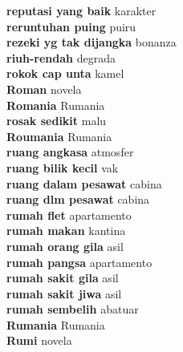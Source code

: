 \textbf{ reputasi yang baik  } karakter \\
\textbf{ reruntuhan puing  } puiru \\
\textbf{ rezeki yg tak dijangka  } bonanza \\
\textbf{ riuh-rendah  } degrada \\
\textbf{ rokok cap unta  } kamel \\
\textbf{ Roman  } novela \\
\textbf{ Romania  } Rumania \\
\textbf{ rosak sedikit  } malu \\
\textbf{ Roumania  } Rumania \\
\textbf{ ruang angkasa  } atmosfer \\
\textbf{ ruang bilik kecil  } vak \\
\textbf{ ruang dalam pesawat  } cabina \\
\textbf{ ruang dlm pesawat  } cabina \\
\textbf{ rumah flet  } apartamento \\
\textbf{ rumah makan  } kantina \\
\textbf{ rumah orang gila  } asil \\
\textbf{ rumah pangsa  } apartamento \\
\textbf{ rumah sakit gila  } asil \\
\textbf{ rumah sakit jiwa  } asil \\
\textbf{ rumah sembelih  } abatuar \\
\textbf{ Rumania  } Rumania \\
\textbf{ Rumi  } novela \\
